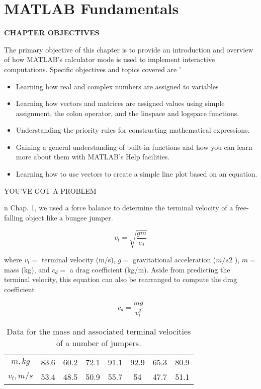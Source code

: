 \documentclass[../main.tex]{subfiles}
\begin{document}
\chapter{MATLAB Fundamentals}

\label{cha:cha3}


\begin{center}
\Large{\textbf{CHAPTER OBJECTIVES}}
\end{center}

\normalsize{The primary objective of this chapter is to provide an introduction and overview of
how MATLAB's calculator mode is used to implement interactive computations.
Specific objectives and topics covered are}
'
\begin{itemize}


	\item Learning how real and complex numbers are assigned to variables
	\item  Learning how vectors and matrices are assigned values using simple assignment,
the colon operator, and the linspace and logspace functions.
\item  Understanding the priority rules for constructing mathematical expressions.
\item  Gaining a general understanding of built-in functions and how you can learn more
about them with MATLAB's Help facilities.
\item  Learning how to use vectors to create a simple line plot based on an equation.
\end{itemize}
\Large{YOU'VE GOT A PROBLEM}
\normalsize

n Chap. 1, we used a force balance to determine the terminal velocity of a free-falling
object like a bungee jumper.

$$v_t=\sqrt{\dfrac{gm}{c_d}}  $$

where $v_t =$ terminal velocity (m/s), $g =$ gravitational acceleration ($m/s2$
), $m =$ mass (kg),
and $c_d =$ a drag coefficient (kg/m). Aside from predicting the terminal velocity, this equation can also be rearranged to compute the drag coefficient
 
\begin{equation}
	\tag{2.1}
	c_d = \dfrac{mg}{v^2_t}
\end{equation} 



	\begin{table}[H]
		\centering
		\caption{Data for the mass and associated terminal velocities of a number of jumpers.}
		\begin{tabular}{cccccccc}
			\hline
			$m, kg$ 	&83.6 &60.2 &72.1 &91.1 &92.9 &65.3 &80.9\\
			$v_t, m/s$ &53.4 &48.5 &50.9 &55.7 &54 &47.7 &51.1\\
			\hline
			
		\end{tabular}
	\end{table}
\end{document}
